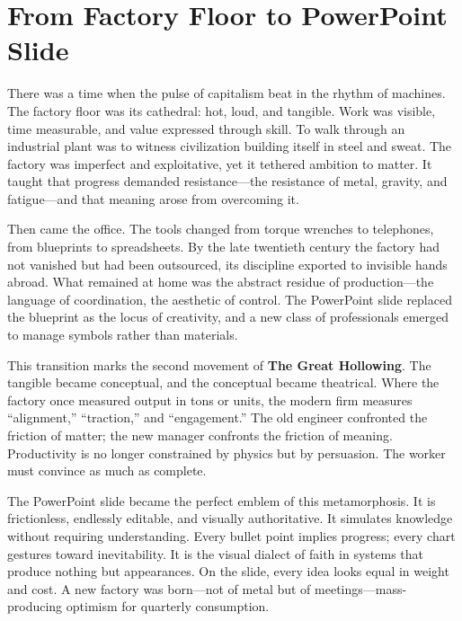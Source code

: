 \documentclass[11pt,twoside]{book}
\begin{document}
%
\chapter{From Factory Floor to PowerPoint Slide}
\label{ch:02}

There was a time when the pulse of capitalism beat in the rhythm of machines.  
The factory floor was its cathedral: hot, loud, and tangible.  Work was visible, time measurable, and value expressed through skill.  To walk through an industrial plant was to witness civilization building itself in steel and sweat.  The factory was imperfect and exploitative, yet it tethered ambition to matter.  It taught that progress demanded resistance—the resistance of metal, gravity, and fatigue—and that meaning arose from overcoming it.

Then came the office.  The tools changed from torque wrenches to telephones, from blueprints to spreadsheets.  By the late twentieth century the factory had not vanished but had been outsourced, its discipline exported to invisible hands abroad.  What remained at home was the abstract residue of production—the language of coordination, the aesthetic of control.  The PowerPoint slide replaced the blueprint as the locus of creativity, and a new class of professionals emerged to manage symbols rather than materials.

This transition marks the second movement of \textbf{The Great Hollowing}.  
The tangible became conceptual, and the conceptual became theatrical.  
Where the factory once measured output in tons or units, the modern firm measures “alignment,” “traction,” and “engagement.”  The old engineer confronted the friction of matter; the new manager confronts the friction of meaning.  Productivity is no longer constrained by physics but by persuasion.  The worker must convince as much as complete.

The PowerPoint slide became the perfect emblem of this metamorphosis.  
It is frictionless, endlessly editable, and visually authoritative.  It simulates knowledge without requiring understanding.  Every bullet point implies progress; every chart gestures toward inevitability.  It is the visual dialect of faith in systems that produce nothing but appearances.  On the slide, every idea looks equal in weight and cost.  A new factory was born—not of metal but of meetings—mass-producing optimism for quarterly consumption.
\end{document}
